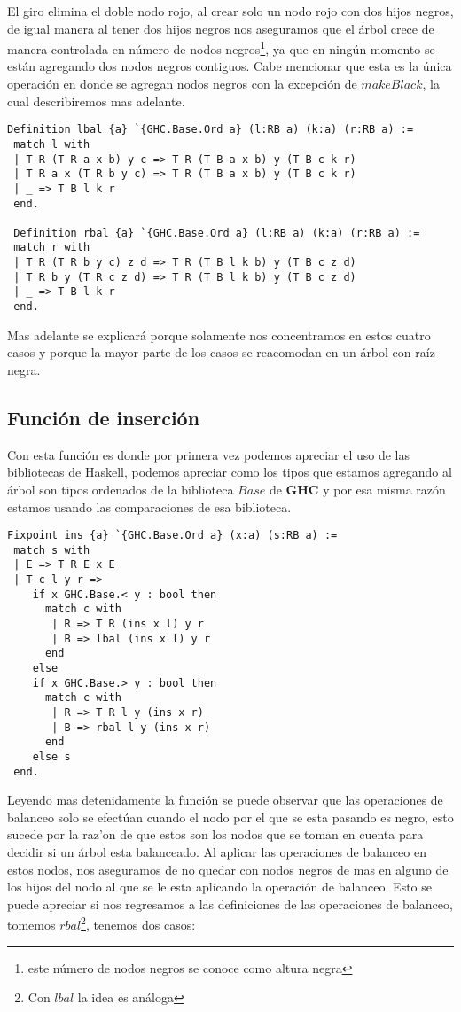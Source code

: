 \documentclass[letterpaper,12pt,oneside]{book}
\theoremstyle{plain}
\theoremstyle{definition}
\theoremstyle{remark}
\begin{document}
El giro elimina el doble nodo rojo, al crear solo un nodo rojo con dos hijos negros, de igual manera al tener dos hijos negros nos aseguramos que el árbol crece de manera controlada 
en n\'umero de nodos negros\footnote{este n\'umero de nodos negros se conoce como altura negra}, ya que en ningún momento se están agregando dos nodos negros contiguos. Cabe mencionar que esta es la única operación en donde se agregan nodos negros con la excepción de $makeBlack$, la cual describiremos mas adelante.
\begin{verbatim}
Definition lbal {a} `{GHC.Base.Ord a} (l:RB a) (k:a) (r:RB a) :=
 match l with
 | T R (T R a x b) y c => T R (T B a x b) y (T B c k r)
 | T R a x (T R b y c) => T R (T B a x b) y (T B c k r)
 | _ => T B l k r
 end.

 Definition rbal {a} `{GHC.Base.Ord a} (l:RB a) (k:a) (r:RB a) :=
 match r with
 | T R (T R b y c) z d => T R (T B l k b) y (T B c z d)
 | T R b y (T R c z d) => T R (T B l k b) y (T B c z d)
 | _ => T B l k r
 end.
\end{verbatim}

Mas adelante se explicar\'a porque solamente nos concentramos en estos cuatro casos y porque la mayor parte de los casos se reacomodan en un \'arbol con ra\'iz negra.
\subsection {Funci\'on de inserci\'on}
Con esta funci\'on es donde por primera vez podemos apreciar el uso de las  bibliotecas de Haskell, podemos apreciar como los tipos que estamos
agregando al \'arbol son tipos ordenados de la biblioteca $Base$ de \textbf{GHC} y por esa misma raz\'on estamos usando las comparaciones de esa biblioteca.

\begin{verbatim}
Fixpoint ins {a} `{GHC.Base.Ord a} (x:a) (s:RB a) :=
 match s with
 | E => T R E x E
 | T c l y r =>
    if x GHC.Base.< y : bool then 
      match c with
       | R => T R (ins x l) y r
       | B => lbal (ins x l) y r
      end
    else 
    if x GHC.Base.> y : bool then 
      match c with
       | R => T R l y (ins x r)
       | B => rbal l y (ins x r)
      end
    else s
 end.
\end{verbatim}

Leyendo mas detenidamente la funci\'on se puede observar que las operaciones de balanceo solo se efectúan
cuando el nodo por el que se esta pasando es negro, esto sucede por la raz'on de que estos son los nodos 
que se toman en cuenta para decidir si un \'arbol esta balanceado. Al aplicar las operaciones de balanceo
en estos nodos, nos aseguramos de no quedar con nodos negros de mas en alguno de los hijos del nodo al 
que se le esta aplicando la operación de balanceo. Esto se puede apreciar si nos regresamos a las 
definiciones de las operaciones de balanceo, tomemos $rbal$\footnote{Con $lbal$ la idea es an\'aloga}, tenemos dos casos:
\end{document}
